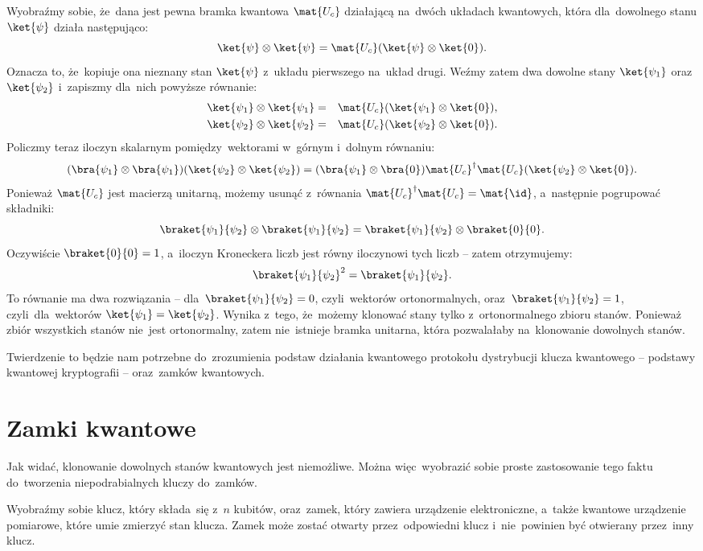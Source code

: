 Wyobraźmy sobie, że~dana jest pewna bramka kwantowa $\mat{U_c}$ działającą
na~dwóch układach kwantowych, która dla~dowolnego stanu $\ket{\psi}$
działa następująco:
$$
	\ket{\psi}\otimes \ket{\psi} = \mat{U_c} (\ket{\psi}\otimes\ket{0}).
$$
Oznacza to, że~kopiuje ona nieznany stan $\ket{\psi}$ z~układu pierwszego na~układ drugi.
Weźmy zatem dwa dowolne stany $\ket{\psi_1}$ oraz~$\ket{\psi_2}$ i~zapiszmy dla~nich powyższe równanie:
\begin{eqnarray}
	\ket{\psi_1}\otimes \ket{\psi_1} &=& \mat{U_c} (\ket{\psi_1}\otimes\ket{0}),\nonumber\\
	\ket{\psi_2}\otimes \ket{\psi_2} &=& \mat{U_c} (\ket{\psi_2}\otimes\ket{0}).\nonumber
\end{eqnarray}
Policzmy teraz iloczyn skalarnym pomiędzy~wektorami w~górnym i~dolnym równaniu:
$$
	(\bra{\psi_1}\otimes \bra{\psi_1})(\ket{\psi_2}\otimes \ket{\psi_2}) =  (\bra{\psi_1}\otimes\bra{0}) \mat{U_c}^\dagger \mat{U_c} (\ket{\psi_2}\otimes\ket{0}).
$$
Ponieważ $\mat{U_c}$ jest macierzą unitarną, możemy usunąć z~równania $\mat{U_c}^\dagger \mat{U_c} =\mat{\id}$, a~następnie pogrupować składniki:
$$
	\braket{\psi_1}{\psi_2} \otimes \braket{\psi_1}{\psi_2} =  \braket{\psi_1}{\psi_2}\otimes\braket{0}{0}.
$$
Oczywiście $\braket{0}{0}=1$, a~iloczyn Kroneckera liczb jest równy iloczynowi tych liczb -- zatem otrzymujemy:
$$
	\braket{\psi_1}{\psi_2}^2 = \braket{\psi_1}{\psi_2}.
$$
To równanie ma dwa rozwiązania -- dla~$\braket{\psi_1}{\psi_2}=0$, czyli~wektorów
ortonormalnych, oraz~$\braket{\psi_1}{\psi_2}=1$, czyli~dla~wektorów $\ket{\psi_1}=\ket{\psi_2}$.
Wynika z~tego, że~możemy klonować stany tylko z~ortonormalnego zbioru stanów. Ponieważ
zbiór wszystkich stanów nie~jest ortonormalny, zatem nie~istnieje bramka unitarna,
która pozwalałaby na~klonowanie dowolnych stanów.

Twierdzenie to będzie nam potrzebne do~zrozumienia podstaw działania kwantowego
protokołu dystrybucji klucza kwantowego -- podstawy kwantowej kryptografii --
oraz~zamków kwantowych.

\section{Zamki kwantowe}
Jak widać, klonowanie dowolnych stanów kwantowych jest niemożliwe. Można więc~wyobrazić
sobie proste zastosowanie tego faktu do~tworzenia niepodrabialnych
kluczy do~zamków.

Wyobraźmy sobie klucz, który składa~się z~$n$ kubitów, oraz~zamek, który zawiera
urządzenie elektroniczne, a~także kwantowe urządzenie pomiarowe, które umie zmierzyć
stan klucza. Zamek może zostać otwarty przez~odpowiedni klucz
i~nie~powinien być otwierany przez~inny klucz.

